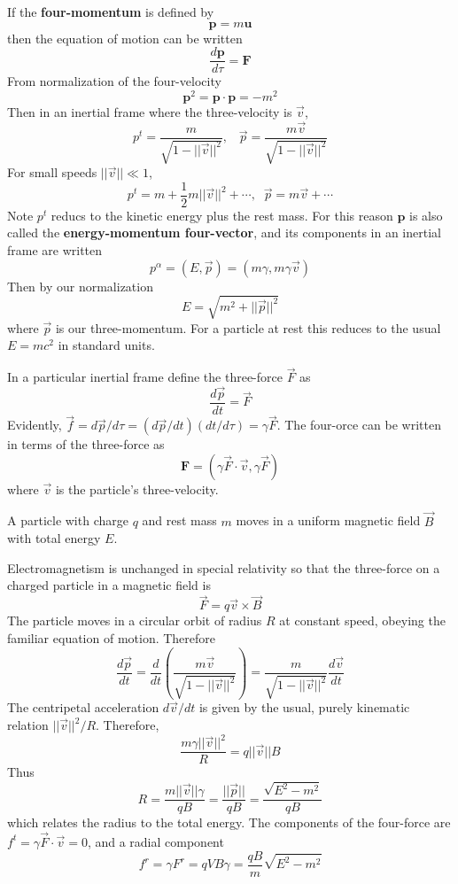 If the \textbf{four-momentum} is defined by $$\mathbf{p} = m\mathbf{u}$$
then the equation of motion can be written $$\frac{d\mathbf{p}}{d\tau} = \mathbf{F}$$
From normalization of the four-velocity $$\mathbf{p}^2 = \mathbf{p}\cdot\mathbf{p} = -m^2$$
Then in an inertial frame where the three-velocity is $\vec{v}$, $$p^t = \frac{m}{\sqrt{1-||\vec{v}||^2}},\;\;\;\vec{p} = \frac{m\vec{v}}{\sqrt{1-||\vec{v}||^2}}$$
For small speeds $||\vec{v}|| \ll 1$, $$p^t = m+\frac{1}{2}m||\vec{v}||^2+\cdots,\;\;\vec{p} = m\vec{v}+\cdots$$
Note $p^t$ reducs to the kinetic energy plus the rest mass. For this reason $\mathbf{p}$ is also called the \textbf{energy-momentum four-vector}, and its components in an inertial frame are written $$p^{\alpha} = (E,\vec{p}) = (m\gamma,m\gamma \vec{v})$$
Then by our normalization $$E = \sqrt{m^2+||\vec{p}||^2}$$
where $\vec{p}$ is our three-momentum. For a particle at rest this reduces to the usual $E = mc^2$ in standard units.

In a particular inertial frame define the three-force $\vec{F}$ as $$\frac{d\vec{p}}{dt} = \vec{F}$$
Evidently, $\vec{f} = d\vec{p}/d\tau = (d\vec{p}/dt)(dt/d\tau) = \gamma\vec{F}$. The four-orce can be written in terms of the three-force as $$\boxed{\mathbf{F} = (\gamma\vec{F}\cdot\vec{v},\gamma\vec{F})}$$
where $\vec{v}$ is the particle's three-velocity.

\begin{eg}
    A particle with charge $q$ and rest mass $m$ moves in a uniform magnetic field $\vec{B}$ with total energy $E$. 

    Electromagnetism is unchanged in special relativity so that the three-force on a charged particle in a magnetic field is $$\vec{F} = q\vec{v}\times \vec{B}$$
    The particle moves in a circular orbit of radius $R$ at constant speed, obeying the familiar equation of motion. Therefore $$\frac{d\vec{p}}{dt} = \frac{d}{dt}\left(\frac{m\vec{v}}{\sqrt{1-||\vec{v}||^2}}\right) = \frac{m}{\sqrt{1-||\vec{v}||^2}}\frac{d\vec{v}}{dt}$$
    The centripetal acceleration $d\vec{v}/dt$ is given by the usual, purely kinematic relation $||\vec{v}||^2/R$. Therefore, $$\frac{m\gamma ||\vec{v}||^2}{R} = q||\vec{v}||B$$
    Thus $$R = \frac{m||\vec{v}||\gamma}{qB} = \frac{||\vec{p}||}{qB} = \frac{\sqrt{E^2-m^2}}{qB}$$
    which relates the radius to the total energy. The components of the four-force are $f^t = \gamma\vec{F}\cdot\vec{v} = 0$, and a radial component $$f^r = \gamma F^r = qVB\gamma = \frac{qB}{m}\sqrt{E^2-m^2}$$
\end{eg}




